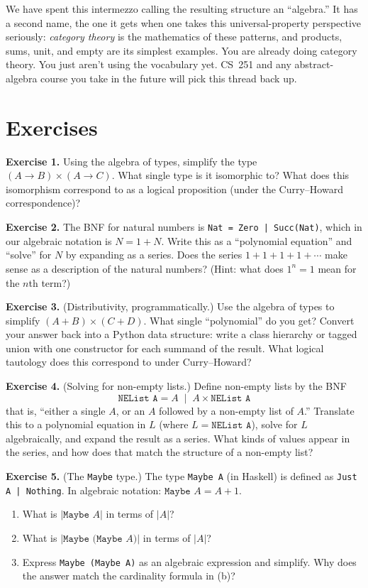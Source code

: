 \documentclass[11pt]{article}
\begin{document}
We have spent this intermezzo calling the resulting structure an ``algebra.'' It has a second name, the one it gets when one takes this universal-property perspective seriously: \emph{category theory} is the mathematics of these patterns, and products, sums, unit, and empty are its simplest examples. You are already doing category theory. You just aren't using the vocabulary yet. CS~251 and any abstract-algebra course you take in the future will pick this thread back up.

\section{Exercises}

\bigskip
\textbf{Exercise 1.}\label{ex:ta:1} Using the algebra of types, simplify the type $(A \to B) \times (A \to C)$. What single type is it isomorphic to? What does this isomorphism correspond to as a logical proposition (under the Curry--Howard correspondence)?

\bigskip
\textbf{Exercise 2.}\label{ex:ta:2} The BNF for natural numbers is \texttt{Nat = Zero | Succ(Nat)}, which in our algebraic notation is $N = 1 + N$. Write this as a ``polynomial equation'' and ``solve'' for $N$ by expanding as a series. Does the series $1 + 1 + 1 + 1 + \cdots$ make sense as a description of the natural numbers? (Hint: what does $1^n = 1$ mean for the $n$th term?)

\bigskip
\textbf{Exercise 3.}\label{ex:ta:3} (Distributivity, programmatically.) Use the algebra of types to simplify $(A + B) \times (C + D)$. What single ``polynomial'' do you get? Convert your answer back into a Python data structure: write a class hierarchy or tagged union with one constructor for each summand of the result. What logical tautology does this correspond to under Curry--Howard?

\bigskip
\textbf{Exercise 4.}\label{ex:ta:4} (Solving for non-empty lists.) Define non-empty lists by the BNF
\[
  \texttt{NEList A} = A \;\mid\; A \times \texttt{NEList A}
\]
that is, ``either a single $A$, or an $A$ followed by a non-empty list of $A$.'' Translate this to a polynomial equation in $L$ (where $L = \texttt{NEList A}$), solve for $L$ algebraically, and expand the result as a series. What kinds of values appear in the series, and how does that match the structure of a non-empty list?

\bigskip
\textbf{Exercise 5.}\label{ex:ta:5} (The \texttt{Maybe} type.) The type \texttt{Maybe A} (in Haskell) is defined as \texttt{Just A | Nothing}. In algebraic notation: $\texttt{Maybe } A = A + 1$.
\begin{enumerate}[label=(\alph*)]
  \item What is $|\texttt{Maybe } A|$ in terms of $|A|$?
  \item What is $|\texttt{Maybe (Maybe } A\texttt{)}|$ in terms of $|A|$?
  \item Express \texttt{Maybe (Maybe A)} as an algebraic expression and simplify. Why does the answer match the cardinality formula in (b)?
\end{enumerate}
\end{document}
